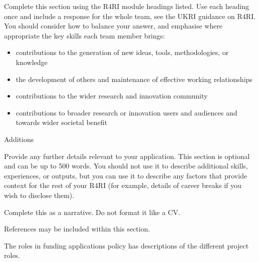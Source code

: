 \begin{instruction}
Complete this section using the R4RI module headings listed. Use each
heading once and include a response for the whole team, see the UKRI
guidance on R4RI. You should consider how to balance your answer, and
emphasise where appropriate the key skills each team member brings:

\begin{itemize}

    \item contributions to the generation of new ideas, tools, methodologies, or
knowledge

    \item the development of others and maintenance of effective working relationships

    \item contributions to the wider research and innovation community

    \item contributions to broader research or innovation users and audiences and
towards wider societal benefit

\end{itemize}

Additions

Provide any further details relevant to your application. This section is
optional and can be up to 500 words. You should not use it to describe
additional skills, experiences, or outputs, but you can use it to describe any
factors that provide context for the rest of your R4RI (for example, details of
career breaks if you wish to disclose them).

Complete this as a narrative. Do not format it like a CV.

References may be included within this section.

The roles in funding applications policy has descriptions of the different
project roles.

\end{instruction}
